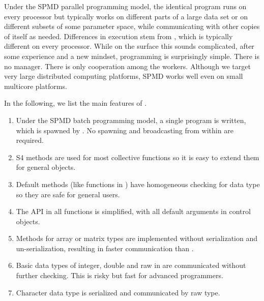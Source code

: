 
Under the SPMD parallel programming model, the identical program runs
on every processor but typically works on different parts of a large
data set or on different subsets of some parameter space, while
communicating with other copies of itself as
needed. Differences in execution stem from , which is
typically different on every processor. While on the surface this
sounds complicated, after some experience and a new mindset,
programming is surprisingly simple. There is no manager. There is only
cooperation among the workers. Although we target very large
distributed computing platforms, SPMD works well even on small
multicore platforms.

In the following, we list the main features of .
\begin{enumerate}
\item Under the SPMD batch programming model, a single program is
  written, which is spawned by . No spawning
  and broadcasting from within  are required.
\item S4 methods are used for most collective functions so it is easy
  to extend them for general  objects.
\item Default methods (like  functions in ) have
  homogeneous checking for data type so they are safe for general
  users.
\item The API in all functions is simplified, with all default arguments
  in control objects.
\item Methods for array or matrix types are implemented without
  serialization and un-serialization, resulting in faster
  communication than .
\item Basic data types of integer, double and raw in  are
  communicated without further checking. This is risky but fast for
  advanced programmers.
\item Character data type is serialized and communicated by raw type.
\end{enumerate}

